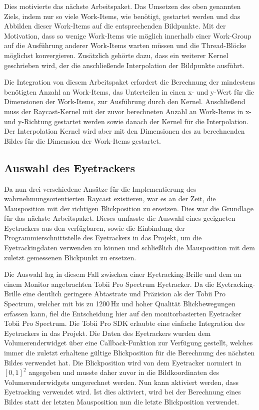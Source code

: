 Dies motivierte das nächste Arbeitspaket.
Das Umsetzen des oben genannten Ziels, indem nur so viele Work-Items, wie benötigt, gestartet werden und das Abbilden dieser Work-Items auf die entsprechenden Bildpunkte.
Mit der Motivation, dass so wenige Work-Items wie möglich innerhalb einer Work-Group auf die Ausführung anderer Work-Items warten müssen und die Thread-Blöcke möglichst konvergieren.
Zusätzlich gehörte dazu, dass ein weiterer Kernel geschrieben wird, der die anschließende Interpolation der Bildpunkte ausführt.

Die Integration von diesem Arbeitspaket erfordert die Berechnung der mindestens benötigten Anzahl an Work-Items, das Unterteilen in einen x- und y-Wert für die Dimensionen der Work-Items, zur Ausführung durch den Kernel.
Anschließend muss der Raycast-Kernel mit der zuvor berechneten Anzahl an Work-Items in x- und y-Richtung gestartet werden sowie danach der Kernel für die Interpolation.
Der Interpolation Kernel wird aber mit den Dimensionen des zu berechnenden Bildes für die Dimension der Work-Items gestartet. 

\subsection{Auswahl des Eyetrackers}
Da nun drei verschiedene Ansätze für die Implementierung des wahrnehmungsorientierten Raycast existieren, war es an der Zeit, die Mausposition mit der richtigen Blickposition zu ersetzen.
Dies war die Grundlage für das nächste Arbeitspaket.
Dieses umfasste die Auswahl eines geeigneten Eyetrackers aus den verfügbaren, sowie die Einbindung der Programmierschnittstelle des Eyetrackers in das Projekt, um die Eyetrackingdaten verwenden zu können und schließlich die Mausposition mit dem zuletzt gemessenen Blickpunkt zu ersetzen.

Die Auswahl lag in diesem Fall zwischen einer Eyetracking-Brille und dem an einem Monitor angebrachten Tobii Pro Spectrum Eyetracker.
Da die Eyetracking-Brille eine deutlich geringere Abtastrate und Präzision als der Tobii Pro Spectrum, welcher mit bis zu 1200\,Hz und hoher Qualität Blickbewegungen erfassen kann, fiel die Entscheidung hier auf den monitorbasierten Eyetracker Tobii Pro Spectrum.
Die Tobii Pro SDK erlaubte eine einfache Integration des Eyetrackers in das Projekt.
Die Daten des Eyetrackers wurden dem Volumerenderwidget über eine Callback-Funktion zur Verfügung gestellt, welches immer die zuletzt erhaltene gültige Blickposition für die Berechnung des nächsten Bildes verwendet hat.
Die Blickposition wird von dem Eyetracker normiert in $[0,1]^2$ angegeben und musste daher zuvor in die Bildkoordinaten des Volumerenderwidgets umgerechnet werden.
Nun kann aktiviert werden, dass Eyetracking verwendet wird.
Ist dies aktiviert, wird bei der Berechnung eines Bildes statt der letzten Mausposition nun die letzte Blickposition verwendet.

